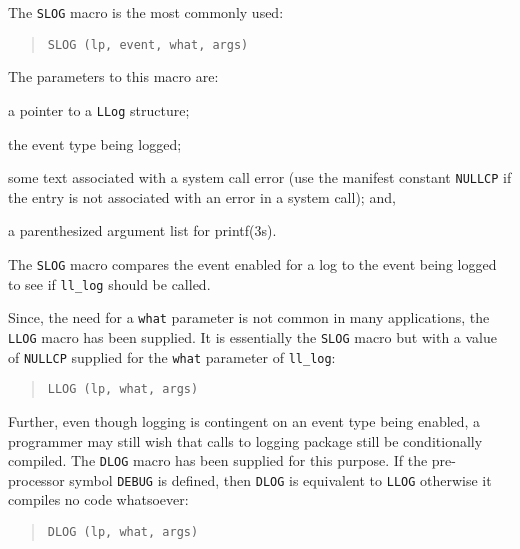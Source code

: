 The \verb"SLOG" macro is the most commonly used:
\begin{quote}\small\begin{verbatim}
SLOG (lp, event, what, args)
\end{verbatim}\end{quote}
The parameters to this macro are:
\begin{describe}
\item[\verb"lp":] a pointer to a \verb"LLog" structure;

\item[\verb"event":] the event type being logged;

\item[\verb"what":] some text associated with a system call error
(use the manifest constant \verb"NULLCP" if the entry is not associated with
an error in a system call); and,

\item[\verb"args":] a parenthesized argument list for \man printf(3s).
\end{describe}
The \verb"SLOG" macro compares the event enabled for a log to the event being
logged to see if \verb"ll_log" should be called.

Since, the need for a \verb"what" parameter is not common in many
applications,
the \verb"LLOG" macro has been supplied.
It is essentially the \verb"SLOG" macro but with a value of \verb"NULLCP"
supplied for the \verb"what" parameter of \verb"ll_log":
\begin{quote}\small\begin{verbatim}
LLOG (lp, what, args)
\end{verbatim}\end{quote}

Further,
even though logging is contingent on an event type being enabled,
a programmer may still wish that calls to logging package still be
conditionally compiled.
The \verb"DLOG" macro has been supplied for this purpose.
If the pre-processor symbol \verb"DEBUG" is defined,
then \verb"DLOG" is equivalent to \verb"LLOG" otherwise it compiles no code
whatsoever:
\begin{quote}\small\begin{verbatim}
DLOG (lp, what, args)
\end{verbatim}\end{quote}

